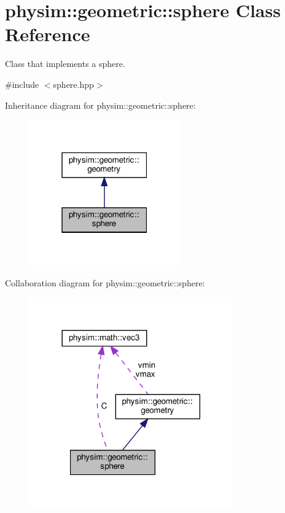 \hypertarget{classphysim_1_1geometric_1_1sphere}{}\section{physim\+:\+:geometric\+:\+:sphere Class Reference}
\label{classphysim_1_1geometric_1_1sphere}


Class that implements a sphere.  




{\ttfamily \#include $<$sphere.\+hpp$>$}



Inheritance diagram for physim\+:\+:geometric\+:\+:sphere\+:\nopagebreak
\begin{figure}[H]
\begin{center}
\leavevmode
\includegraphics[width=183pt]{classphysim_1_1geometric_1_1sphere__inherit__graph}
\end{center}
\end{figure}


Collaboration diagram for physim\+:\+:geometric\+:\+:sphere\+:\nopagebreak
\begin{figure}[H]
\begin{center}
\leavevmode
\includegraphics[width=248pt]{classphysim_1_1geometric_1_1sphere__coll__graph}
\end{center}
\end{figure}
